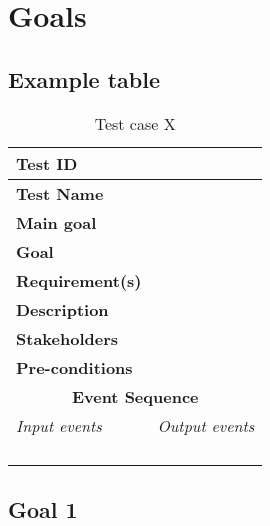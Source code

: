 \section{Goals}

\subsection{Example table}


\begin{table}[H]
\centering
\begin{tabularx}{\linewidth}{X|X}
  \hline
  \textbf{Test ID} & \\
  \hline
  \textbf{Test Name} &  \\
  \hline
  \textbf{Main goal} &  \\
  \hline
  \textbf{Goal} &  \\
  \hline
  \textbf{Requirement(s)} &  \\
  \hline
  \textbf{Description} &  \\
  \hline
  \textbf{Stakeholders} &  \\
  \hline
  \textbf{Pre-conditions} &  \\
  \hline
  \multicolumn{2}{c}{\textbf{Event Sequence}} \\
  \hline
  \textit{Input events} & \textit{Output events} \\
  \hline
   &  \\
  \hline
   &  \\
  \hline
   &  \\
  \hline
   &  \\
  \hline
  \end{tabularx}
\caption{\label{tab_caseX} Test case X}
\end{table}




\subsection{Goal 1}

